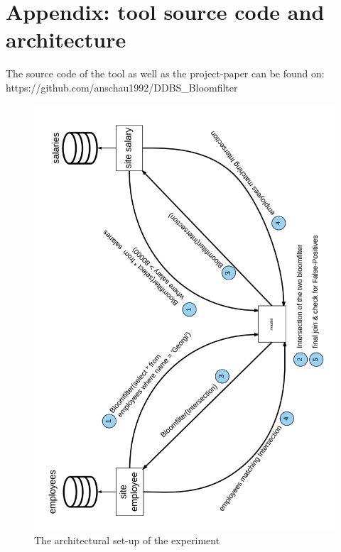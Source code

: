 \documentclass[12]{scrartcl}
\begin{document}
\section{Appendix: tool source code and architecture}
The source code of the tool as well as the project-paper can be found on:\\ https://github.com/anschau1992/DDBS\_Bloomfilter
\begin{figure}[H]
	\begin{center}
		\includegraphics[scale=0.13]{res/architecture_lc.png}
	\end{center}
	\caption{The architectural set-up of the experiment}
\end{figure}
\end{document}
